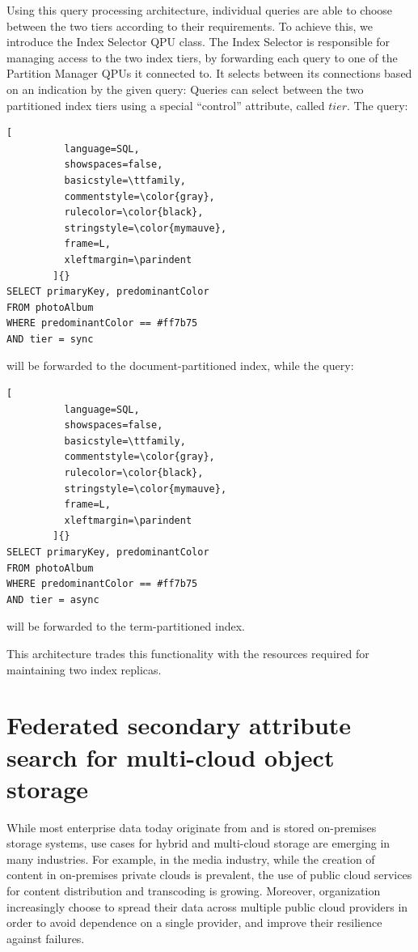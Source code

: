 Using this query processing architecture, individual queries are able to choose between the two tiers
according to their requirements.
To achieve this, we introduce the Index Selector QPU class.
The Index Selector is responsible for managing access to the two index tiers,
by forwarding each query to one of the Partition Manager QPUs it connected to.
It selects between its connections based on an indication by the given query:
Queries can select between the two partitioned index tiers using a special ``control'' attribute, called $tier$.
The query:

\begin{lstlisting}[
          language=SQL,
          showspaces=false,
          basicstyle=\ttfamily,
          commentstyle=\color{gray},
          rulecolor=\color{black},
          stringstyle=\color{mymauve},
          frame=L,
          xleftmargin=\parindent
        ]{}
SELECT primaryKey, predominantColor
FROM photoAlbum
WHERE predominantColor == #ff7b75
AND tier = sync
\end{lstlisting}

\noindent
will be forwarded to the document-partitioned index, while the query:

\begin{lstlisting}[
          language=SQL,
          showspaces=false,
          basicstyle=\ttfamily,
          commentstyle=\color{gray},
          rulecolor=\color{black},
          stringstyle=\color{mymauve},
          frame=L,
          xleftmargin=\parindent
        ]{}
SELECT primaryKey, predominantColor
FROM photoAlbum
WHERE predominantColor == #ff7b75
AND tier = async
\end{lstlisting}

will be forwarded to the term-partitioned index.

This architecture trades this functionality with the resources required for maintaining
two index replicas.



\section{Federated secondary attribute search for multi-cloud object storage}
\label{sec:zenko}

While most enterprise data today originate from and is stored on-premises storage systems,
use cases for hybrid and multi-cloud storage are emerging in many industries.
For example, in the media industry, while the creation of content in on-premises private clouds is prevalent,
the use of public cloud services for content distribution and transcoding \cite{scality:bloomberg} is growing.
Moreover, organization increasingly choose to spread their data across multiple public cloud providers in order to avoid
dependence on a single provider, and improve their resilience against failures.

